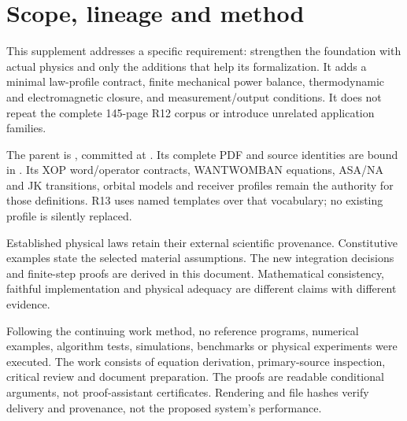 \section*{Scope, lineage and method}
This supplement addresses a specific requirement: strengthen the foundation
with actual physics and only the additions that help its formalization.
It adds a minimal law-profile contract, finite mechanical power balance,
thermodynamic and electromagnetic closure, and measurement/output conditions.
It does not repeat the complete 145-page R12 corpus or introduce unrelated
application families.

The parent is , committed at
. Its complete PDF and source identities are bound in
. Its XOP word/operator contracts, WANTWOMBAN
equations, ASA/NA and JK transitions, orbital models and receiver profiles
remain the authority for those definitions. R13 uses named templates over
that vocabulary; no existing profile is silently replaced.

Established physical laws retain their external scientific provenance.
Constitutive examples state the selected material assumptions. The new
integration decisions and finite-step proofs are derived in this document.
Mathematical consistency, faithful implementation and physical adequacy are
different claims with different evidence.

Following the continuing work method, no reference programs, numerical
examples, algorithm tests, simulations, benchmarks or physical experiments
were executed. The work consists of equation derivation, primary-source
inspection, critical review and document preparation. The proofs are readable
conditional arguments, not proof-assistant certificates. Rendering and file
hashes verify delivery and provenance, not the proposed system's performance.

\tableofcontents\clearpage






